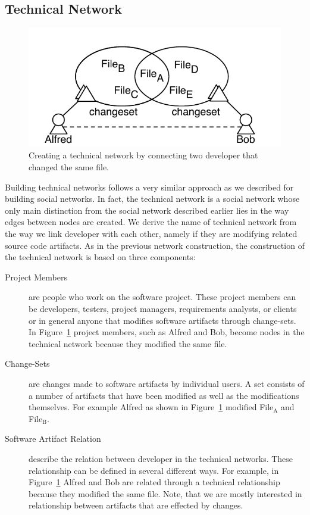 \subsection{Technical Network}
\begin{figure}[t!]
\centering
\includegraphics[width=.7\textwidth]{figures/cochangedfiles}
\caption{Creating a technical network by connecting two developer that changed the same file.}
\label{fig:addtechnicaledge}
\end{figure}

Building technical networks follows a very similar approach as we described for building social networks.
In fact, the technical network is a social network whose only main distinction from the social network described earlier lies in the way edges between nodes are created.
We derive the name of technical network from the way we link developer with each other, namely if they are modifying related source code artifacts.
As in the previous network construction, the construction of the technical network is based on three components:

\begin{description}
\item[Project Members] are people who work on the software project. 
These project members can be developers, testers, project managers, requirements analysts,
or clients or in general anyone that modifies software artifacts through change-sets. 
In Figure~\ref{fig:addtechnicaledge} project members, such as Alfred and Bob, become nodes in the technical network because they modified the same file.

\item[Change-Sets] are changes made to software artifacts by individual users. 
A set consists of a number of artifacts that have been modified as well as the modifications themselves.
For example Alfred as shown in Figure~\ref{fig:addtechnicaledge} modified File$_{\text{A}}$ and File$_{\text{B}}$.

\item[Software Artifact Relation] describe the relation between developer in the technical networks.
These relationship can be defined in several different ways.
For example, in Figure~\ref{fig:addtechnicaledge} Alfred and Bob are related through a technical relationship because they modified the same file.
Note, that we are mostly interested in relationship between artifacts that are effected by changes.
\end{description}

